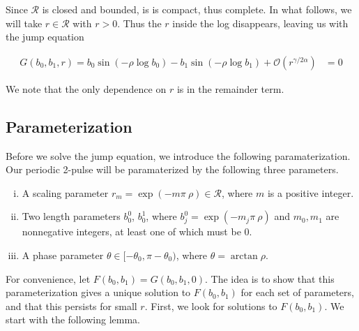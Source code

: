 \documentclass[12pt]{article}
\begin{document}
Since $\mathcal{R}$ is closed and bounded, is is compact, thus complete. In what follows, we will take $r \in \mathcal{R}$ with $r > 0$. Thus the $r$ inside the log disappears, leaving us with the jump equation

\begin{align}\label{jumpcond3}
G(b_0, b_1,r) =
b_0 \sin(-\rho \log b_0 ) - b_1 \sin(-\rho \log b_1 ) + \mathcal{O}(r^{\gamma / 2 \alpha}) &= 0
\end{align}

We note that the only dependence on $r$ is in the remainder term.

\subsection{Parameterization}

Before we solve the jump equation, we introduce the following paramaterization. Our periodic 2-pulse will be paramaterized by the following three parameters.

\begin{enumerate}[(i)]
\item A scaling parameter $r_m = \exp(-m \pi \ \rho ) \in \mathcal{R}$, where $m$ is a positive integer.
\item Two length parameters $b_0^0$, $b_0^1$, where $b_j^0 = \exp(-m_j \pi \ \rho )$ and $m_0, m_1$ are nonnegative integers, at least one of which must be 0. 
\item A phase parameter $\theta \in [-\theta_0,\pi - \theta_0)$, where $\theta = \arctan \rho$.
\end{enumerate}

For convenience, let $F(b_0, b_1) = G(b_0, b_1, 0)$. The idea is to show that this parameterization gives a unique solution to $F(b_0, b_1)$ for each set of parameters, and that this persists for small $r$. First, we look for solutions to $F(b_0, b_1)$. We start with the following lemma.
\end{document}
